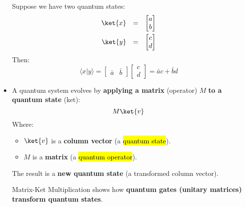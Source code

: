 \begin{itemize}
    \begin{examplebox}
        Suppose we have two quantum states:
        \begin{equation*}
            \begin{array}{rcl}
                \ket{x} &=& \begin{bmatrix}
                    a \\ b
                \end{bmatrix} \\ [1em]
                \ket{y} &=& \begin{bmatrix}
                    c \\ d
                \end{bmatrix}
            \end{array}
        \end{equation*}
        Then:
        \begin{equation*}
            \langle x | y \rangle = \begin{bmatrix}
                \bar{a} & \bar{b}
            \end{bmatrix}
            \begin{bmatrix}
                c \\ d
            \end{bmatrix}
            = \bar{a}c + \bar{b}d
        \end{equation*}
    \end{examplebox}


    \item {}

    A quantum system evolves by \textbf{applying a matrix} (operator) $M$ \textbf{to a quantum state} (ket):
    \begin{equation*}
        M \ket{v}
    \end{equation*}
    Where:
    \begin{itemize}
        \item $\ket{v}$ is a \textbf{column vector} (a \hl{quantum state}).
        \item $M$ is a \textbf{matrix} (a \hl{quantum operator}).
    \end{itemize}
    The result is a \textbf{new quantum state} (a transformed column vector).

    Matrix-Ket Multiplication shows how \textbf{quantum gates (unitary matrices) transform quantum states}.


\end{itemize}
